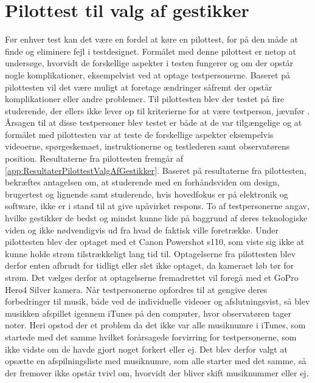 \section{Pilottest til valg af gestikker}
\label{PilottestValgAfGestikker}
%
Før enhver test kan det være en fordel at køre en pilottest, for på den måde at finde og eliminere fejl i testdesignet. Formålet med denne pilottest er netop at undersøge, hvorvidt de forskellige aspekter i testen fungerer og om der opstår nogle komplikationer, eksempelvist ved at optage testpersonerne. Baseret på pilottesten vil det være muligt at foretage ændringer såfremt der opstår komplikationer eller andre problemer.\blankline
%  
Til pilottesten blev der testet på fire studerende, der ellers ikke lever op til kriterierne for at være testperson, jævnfør . Årsagen til at disse testpersoner blev testet er både at de var tilgængelige og at formålet med pilottesten var at teste de forskellige aspekter eksempelvis videoerne, spørgeskemaet, instruktionerne og testlederen samt observatørens position. Resultaterne fra pilottesten fremgår af \autoref{app:ResultaterPilottestValgAfGestikker}. Baseret på resultaterne fra pilottesten, bekræftes antagelsen om, at studerende med en forhåndsviden om design, brugertest og lignende samt studerende, hvis hovedfokus er på elektronik og software, ikke er i stand til at give upåvirket respons. To af testpersonerne angav, hvilke gestikker de bedst og mindst kunne lide på baggrund af deres teknologiske viden og ikke nødvendigvis ud fra hvad de faktisk ville foretrække.\blankline
% 
Under pilottesten blev der optaget med et Canon Powershot s110, som viste sig ikke at kunne holde strøm tilstrækkeligt lang tid til. Optagelserne fra pilottesten blev derfor enten afbrudt for tidligt eller slet ikke optaget, da kameraet løb tør for strøm. Det vælges derfor at optagelserne fremadrettet vil foregå med et GoPro Hero4 Silver kamera.\blankline
% 
Når testpersonerne opfordres til at gengive deres forbedringer til musik, både ved de individuelle videoer og afslutningsvist, så blev musikken afspillet igennem iTunes på den computer, hvor observatøren tager noter. Heri opstod der et problem da det ikke var alle musiknumre i iTunes, som startede med det samme hvilket forårsagede forvirring for testpersonerne, som ikke vidste om de havde gjort noget forkert eller ej. Det blev derfor valgt at opsætte en afspilningsliste med musiknumre, som alle starter med det samme, så der fremover ikke opstår tvivl om, hvorvidt der bliver skift musiknummer eller ej. 

